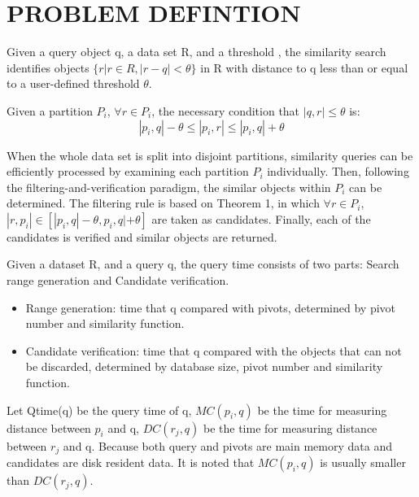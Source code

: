 \documentclass{vldb}
\begin{document}
\section{ PROBLEM  DEFINTION}

\begin{myDef}
Given a query object q, a data set R, and a threshold , the similarity search identifies objects $\{r|r\in R ,|r-q|<\theta \}$ in R with distance to q less than or equal to a user-defined threshold $\theta$.
\end{myDef}

\begin{myTheo}
Given a partition $P_i$, ${\forall r \in P_i}$, the necessary condition that $|q,r| \le \theta$ is:
$$|p_i,q|- \theta \le |p_i,r| \le |p_i,q|+ \theta$$
\end{myTheo}
When the whole data set is split into disjoint partitions, similarity queries can be efficiently processed by examining each partition $P_i$ individually. Then, following the filtering-and-verification paradigm, the similar objects within $P_i$ can be determined. The filtering rule is based on Theorem 1, in which ${\forall r \in P_i}$, $|r,p_i| \in [|p_i,q| -\theta,p_i,q|+ \theta]$ are taken as candidates. Finally, each of the candidates is verified and similar objects are returned.

\begin{myDef}
Given a dataset R, and a query q, the query time consists of two parts:
Search range generation and Candidate verification.
\begin{itemize}
\item  Range generation: time that q compared with pivots, determined by pivot number and similarity function. 
\item  Candidate verification: time that q compared with the objects that can not be discarded, determined by database size, pivot number and similarity function.
\end{itemize}
\end{myDef}
Let Qtime(q) be the query time of q, $MC(p_i,q)$ be the time for measuring distance between $p_i$ and q,  $DC(r_j,q)$ be the time for measuring distance between $r_j$ and q. Because both query and pivots are main memory data and candidates are disk resident data. It is noted that $MC(p_i,q)$ is usually smaller than $DC(r_j,q)$.
\end{document}
